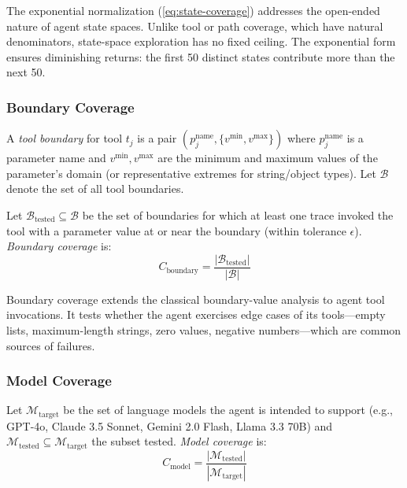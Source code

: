 The exponential normalization (\cref{eq:state-coverage}) addresses the
open-ended nature of agent state spaces. Unlike tool or path coverage,
which have natural denominators, state-space exploration has no fixed
ceiling. The exponential form ensures diminishing returns: the first 50
distinct states contribute more than the next 50.

\subsubsection{Boundary Coverage}
\label{sec:coverage:boundary}

\begin{definition}
\label{def:boundary}
A \emph{tool boundary} for tool $t_j$ is a pair $(p_j^{\text{name}},
\{v^{\min}, v^{\max}\})$ where $p_j^{\text{name}}$ is a parameter name
and $v^{\min}, v^{\max}$ are the minimum and maximum values of the
parameter's domain (or representative extremes for string/object types).
Let $\mathcal{B}$ denote the set of all tool boundaries.
\end{definition}

\begin{definition}
\label{def:boundary-coverage}
Let $\mathcal{B}_{\text{tested}} \subseteq \mathcal{B}$ be the set of
boundaries for which at least one trace invoked the tool with a parameter
value at or near the boundary (within tolerance $\epsilon$).
\emph{Boundary coverage} is:
\begin{equation}
\label{eq:boundary-coverage}
  C_{\text{boundary}} = \frac{|\mathcal{B}_{\text{tested}}|}{|\mathcal{B}|}
\end{equation}
\end{definition}

Boundary coverage extends the classical boundary-value analysis to agent
tool invocations. It tests whether the agent exercises edge cases of
its tools---empty lists, maximum-length strings, zero values, negative
numbers---which are common sources of failures.

\subsubsection{Model Coverage}
\label{sec:coverage:model}

\begin{definition}
\label{def:model-coverage}
Let $\mathcal{M}_{\text{target}}$ be the set of language models the
agent is intended to support (e.g., GPT-4o, Claude 3.5 Sonnet,
Gemini 2.0 Flash, Llama 3.3 70B) and
$\mathcal{M}_{\text{tested}} \subseteq \mathcal{M}_{\text{target}}$ the
subset tested. \emph{Model coverage} is:
\begin{equation}
\label{eq:model-coverage}
  C_{\text{model}} = \frac{|\mathcal{M}_{\text{tested}}|}{|\mathcal{M}_{\text{target}}|}
\end{equation}
\end{definition}

